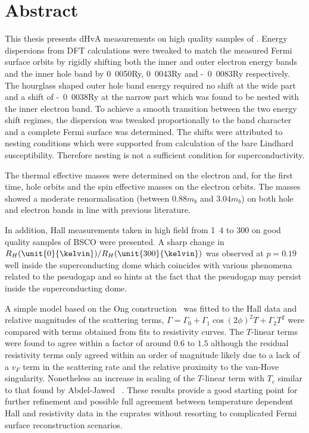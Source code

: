 \thispagestyle{empty}\null\clearpage

\setcounter{page}{1}


\section*{Abstract}


This thesis presents \ac{dHvA} measurements on high quality samples of \BaFeP. Energy dispersions from \ac{DFT} calculations were tweaked to match the measured Fermi surface orbits by rigidly shifting both the inner and outer electron energy bands and the inner hole band by \unit{0.0050}{\textrm{Ry}}, \unit{0.0043}{\textrm{Ry}} and \unit{-0.0083}{\textrm{Ry}} respectively. The hourglass shaped outer hole band energy required no shift at the wide part and a shift of \unit{-0.0038}{\textrm{Ry}} at the narrow part which was found to be nested with the inner electron band. To achieve a smooth transition between the two energy shift regimes, the dispersion was tweaked proportionally to the \DzTwo band character and a complete Fermi surface was determined. The shifts were attributed to nesting conditions which were supported from calculation of the bare Lindhard susceptibility. Therefore nesting is not a sufficient condition for superconductivity.

The thermal effective masses were determined on the electron and, for the first time, hole orbits and the spin effective masses on the electron orbits. The masses showed a moderate renormalisation (between $\unit{0.88}{m_b}$ and $\unit{3.04}{m_b}$) on both hole and electron bands in line with previous literature.

In addition, Hall measurements taken in high field from \unit{1.4}{\kelvin} to \unit{300}{\kelvin} on good quality samples of \ac{BSCO} were presented. A sharp change in $R_H(\unit{0}{\kelvin})/R_H(\unit{300}{\kelvin})$ was observed at $p=0.19$ well inside the superconducting dome which coincides with various phenomena related to the pseudogap and so hints at the fact that the pseudogap may persist inside the superconducting dome.

A simple model based on the Ong construction~\cite{Ong1991} was fitted to the Hall data and relative magnitudes of the scattering terms, $\Gamma = \Gamma_0 + \Gamma_1 \cos(2\phi)^2 T + \Gamma_2 T^2$ were compared with terms obtained from fits to resistivity curves. The $T$-linear terms were found to agree within a factor of around $0.6$ to $1.5$ although the residual resistivity terms only agreed within an order of magnitude likely due to a lack of a $v_F$ term in the scattering rate and the relative proximity to the van-Hove singularity. Nonetheless an increase in scaling of the $T$-linear term with $T_c$ similar to that found by Abdel-Jawed \etal~\cite{Abdel-Jawad2007}. These results provide a good starting point for further refinement and possible full agreement between temperature dependent Hall and resistivity data in the cuprates without resorting to complicated Fermi surface reconstruction scenarios.


